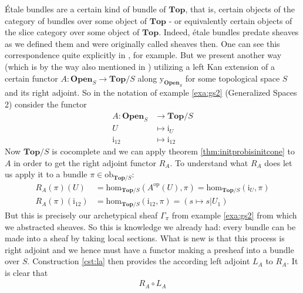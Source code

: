 \begin{exa}
\label{exa:sheafetale}
{\'E}tale bundles are a certain kind of bundle of $\mathbf{Top}$, that is, certain objects of the category of bundles over some object of $\mathbf{Top}$ - or equivalently certain objects of the slice category over some object of $\mathbf{Top}$. Indeed, {\'e}tale bundles predate sheaves as we defined them and were originally called sheaves then. One can see this correspondence quite explicitly in \cite{c55c71e8}, for example. But we present another way (which is by the way also mentioned in \cite{c55c71e8}) utilizing a left Kan extension of a certain functor $A \colon \mathbf{Open}_{S} \rightarrow \mathbf{Top} \slash S$ along $\mathrm{y}_{\mathbf{Open}_{S}}$ for some topological space $S$ and its right adjoint. So in the notation of example \ref{exa:gs2} (Generalized Spaces 2) consider the functor
\begin{align*}
  A
  \colon
  \mathbf{Open}_{S}
  &\rightarrow
  \mathbf{Top}
  \slash
  S
  \\
  U
  &\mapsto
  \mathrm{i}_{U}
  \\
  \mathrm{i}_{12}
  &\mapsto
  \mathrm{i}_{12}
\end{align*}
Now $\mathbf{Top} \slash S$ is cocomplete and we can apply theorem \ref{thm:initprobisinitcone} to $A$ in order to get the right adjoint functor $R_{A}$. To understand what $R_{A}$ does let us apply it to a bundle $\pi \in \mathrm{ob}_{\mathbf{Top} \slash S}$:
\begin{align*}
  R_{A}(\pi)(U)
  &=
  \mathrm{hom}_{\mathbf{Top} \slash S}
  \left(
    A^{\textrm{op}}(U),
    \pi
  \right)
  =
  \mathrm{hom}_{\mathbf{Top} \slash S}
  \left(
    \mathrm{i}_{U},
    \pi
  \right)
  \\
  R_{A}(\pi)(\mathrm{i}_{12})
  &=
  \mathrm{hom}_{\mathbf{Top} \slash S}
  \left(
    \mathrm{i}_{12},
    \pi
  \right)
  =
  \left(
    s
    \mapsto
    s
    \vert
    U_{1}
  \right)
\end{align*}
But this is precisely our archetypical sheaf $\Gamma_{\pi}$ from example \ref{exa:gs2} from which we abstracted sheaves. So this is knowledge we already had: every bundle can be made into a sheaf by taking local sections. What is new is that this process is right adjoint and we hence must have a functor making a presheaf into a bundle over $S$. Construction \ref{cst:la} then provides the according left adjoint $L_{A}$ to $R_{A}$. It is clear that
\begin{align*}
  R_{A}
  \circ
  L_{A}
\end{align*}

\end{exa}
